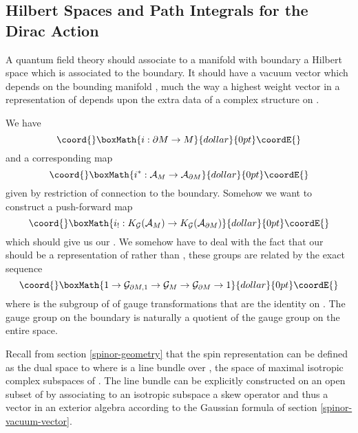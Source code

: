 \documentclass[a4paper,a4paper]{article}
\theoremstyle{conjecture}
\begin{document}
\subsection{Hilbert Spaces and Path Integrals for the Dirac Action}

A quantum field theory should associate to a manifold with boundary \coordHE{} a
Hilbert space \coordHE{} which is associated to the boundary. It should
have a vacuum vector \coordHE{} which depends on the bounding
manifold \coordHE{}, much the way a highest weight vector in a representation of \coordHE{} depends upon
the extra data of a complex structure on \coordHE{}.

We have
$$\coord{}\boxMath{i:\partial M\rightarrow M}{dollar}{0pt}\coordE{}$$
and a corresponding map
$$\coord{}\boxMath{i^*:{\mathcal A}_M\rightarrow {\mathcal A}_{\partial M}}{dollar}{0pt}\coordE{}$$
given by restriction of connection to the boundary.  Somehow we want to construct a push-forward map
$$\coord{}\boxMath{i_!:K_{\mathcal G}({\mathcal A}_M)\rightarrow K_{\mathcal G}({\mathcal A}_{\partial M})}{dollar}{0pt}\coordE{}$$
which should give us our \coordHE{}. We somehow have to deal with the 
fact that our \coordHE{} should be a representation of 
\coordHE{} rather than \coordHE{}, these groups are related by the exact sequence
$$\coord{}\boxMath{1\rightarrow {\mathcal G}_{\partial M,1}\rightarrow {\mathcal G}_M\rightarrow {\mathcal G}_{\partial M}\rightarrow 1}{dollar}{0pt}\coordE{}$$
where \coordHE{} is the subgroup of \coordHE{} of gauge transformations that are the identity
on \coordHE{}. The gauge group on the boundary is naturally a quotient of the gauge group on the entire space.

Recall from section \ref{spinor-geometry} that the spin representation can be defined as the 
dual space to \coordHE{} where \coordHE{} is a line bundle over \coordHE{}, the space of
maximal isotropic complex subspaces of \coordHE{}.  The line bundle \coordHE{} can be explicitly
constructed on an open subset of \coordHE{} by associating to an isotropic subspace a
skew operator and thus a vector in an exterior algebra according to the Gaussian formula
of section \ref{spinor-vacuum-vector}.
\end{document}
